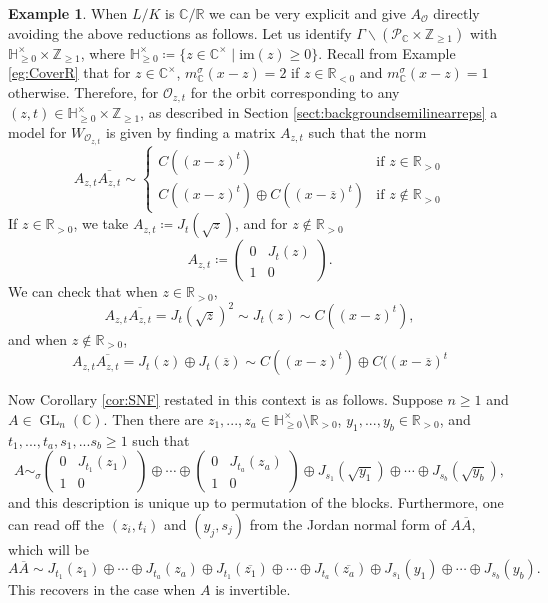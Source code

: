 \documentclass[10pt, reqno, hidelinks]{amsart}
\newcommand{\OO}{\mathcal{O}}
\DeclareMathOperator{\GL}{GL}
\newcommand{\twopartdef}[4]
{
	\left\{
		\begin{array}{ll}
			#1 & \mbox{if } #2 \\
			#3 & \mbox{if } #4
		\end{array}
	\right.
}
\newcommand{\bC}{{\mathbb C}}
\newcommand{\bH}{{\mathbb H}}
\newcommand{\bR}{{\mathbb R}}
\newcommand{\bZ}{{\mathbb Z}}
\newcommand{\sP}{{\mathcal P}}
\numberwithin{thm}{subsection}
\theoremstyle{definition}
\newtheorem{eg}[thm]{Example}
\begin{document}
\begin{eg}
When $L / K$ is $\bC / \bR$ we can be very explicit and give $A_{\OO}$ directly avoiding the above reductions as follows. Let us identify $\Gamma \backslash (\sP_{\bC} \times \bZ_{\geq 1})$ with $\bH_{\geq 0}^{\times} \times \bZ_{\geq 1}$, where $\bH_{\geq 0}^{\times} \coloneqq \{z \in \bC^{\times} \mid \text{im}(z) \geq 0\}$. Recall from Example \ref{eg:CoverR} that for $z \in \bC^{\times}$, $m_{\bC}^{\sigma}(x-z) = 2$ if $z \in \bR_{<0}$ and $m_{\bC}^{\sigma}(x-z) = 1$ otherwise. Therefore, for $\OO_{z,t}$ for the orbit corresponding to any $(z,t) \in \bH_{\geq 0}^{\times} \times \bZ_{\geq 1}$, as described in Section \ref{sect:backgroundsemilinearreps} a model for $W_{\OO_{z,t}}$ is given by finding a matrix $A_{z,t}$ such that the norm
\[
A_{z,t} \overline{A_{z,t}} \sim \twopartdef{C((x-z)^t)}{z \in \bR_{>0}}{C((x-z)^t) \oplus C((x-\overline{z})^t)}{z \not\in \bR_{>0}}
\]
If $z \in \bR_{> 0}$, we take $A_{z,t} \coloneqq J_t(\sqrt{z})$, and for $z \not\in \bR_{> 0}$
\[
A_{z,t} \coloneqq \begin{pmatrix}
	0 & J_t(z) \\ 1 & 0
\end{pmatrix}.
\]
We can check that when $z \in \bR_{> 0}$,
\[
A_{z,t} \overline{A_{z,t}} = J_t(\sqrt{z})^2 \sim J_t(z) \sim C((x - z)^t),
\]
and when $z \not\in \bR_{> 0}$,
\[
A_{z,t} \overline{A_{z,t}} = J_t(z) \oplus J_t(\overline{z}) \sim C((x-z)^t) \oplus C((x-\overline{z})^t
\]

Now Corollary \ref{cor:SNF} restated in this context is as follows. Suppose $n \geq 1$ and $A \in \GL_n(\bC)$. Then
there are $z_1, ... , z_a \in \bH_{\geq 0}^{\times} \setminus \bR_{>0}$, $y_1, ... , y_b \in \bR_{>0}$, and $t_1, ... , t_a, s_1, ... s_b \geq 1$ such that
\[
A \sim_{\sigma} \begin{pmatrix}
	0 & J_{t_1}(z_1) \\ 1 & 0
\end{pmatrix} \oplus \cdots \oplus \begin{pmatrix}
	0 & J_{t_a}(z_a) \\ 1 & 0
\end{pmatrix} \oplus J_{s_1}(\sqrt{y_1}) \oplus \cdots \oplus J_{s_b}(\sqrt{y_b}),
\]
and this description is unique up to permutation of the blocks. Furthermore, one can read off the $(z_i,t_i)$ and $(y_j,s_j)$ from the Jordan normal form of $A \overline{A}$, which will be
\[
A\overline{A} \sim J_{t_1}(z_1) \oplus \cdots \oplus J_{t_a}(z_a) \oplus J_{t_1}(\overline{z_1}) \oplus \cdots \oplus J_{t_a}(\overline{z_a}) \oplus J_{s_1}(y_1) \oplus \cdots \oplus J_{s_{b}}(y_b).
\]
This recovers \cite[Thm.\ 3.1]{HongHorn} in the case when $A$ is invertible.
\end{eg}
\end{document}
